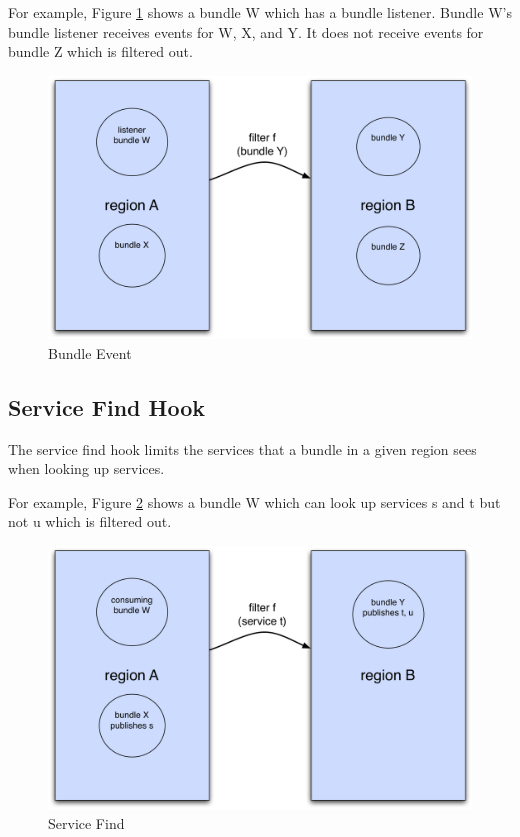 \documentclass[a4paper,9pt,twoside]{article}
\begin{document}
For example, Figure \ref{fig:bevent} shows a bundle W which has a bundle listener.
Bundle W's bundle listener receives events for W, X, and Y. It does not receive events for bundle Z which is filtered out. 
\begin{figure}[h!]
\begin{center}
\includegraphics*[scale=0.4]{bundle-event.pdf}
\caption{Bundle Event \label{fig:bevent}}
\end{center}
\end{figure}

\subsection{Service Find Hook}

The service find hook limits the services that a bundle in a given region sees when looking up services.

For example, Figure \ref{fig:sfind} shows a bundle W which can look up services s and t but not u which is filtered out.
\begin{figure}[h!]
\begin{center}
\includegraphics*[scale=0.4]{service-find.pdf}
\caption{Service Find \label{fig:sfind}}
\end{center}
\end{figure}
\end{document}
